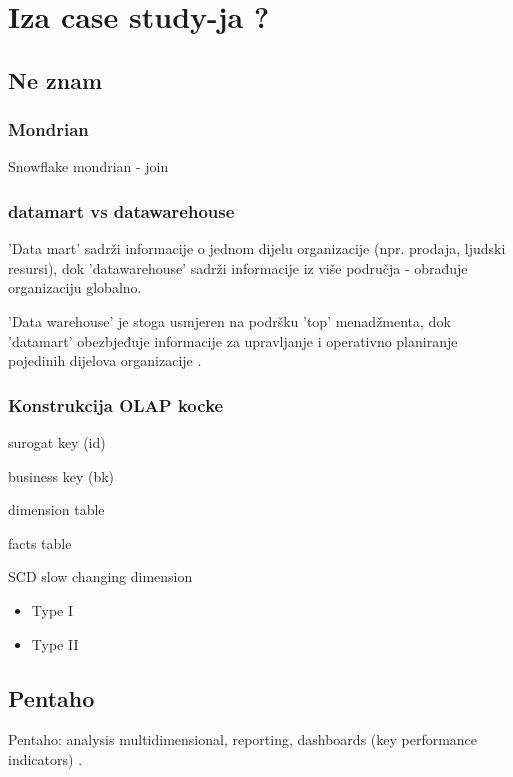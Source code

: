\documentclass[times, utf8, seminar]{fit}
\begin{document}
\chapter{Iza case study-ja ?}

\section{Ne znam}

\subsection{Mondrian}

Snowflake mondrian - join

\cite{web:pentaho:mondrian_schema}

\subsection{datamart vs datawarehouse}

'Data mart' sadrži informacije o jednom dijelu organizacije (npr. prodaja, ljudski resursi), dok 'datawarehouse' sadrži informacije iz više područja -  obrađuje organizaciju globalno. 

'Data warehouse' je stoga usmjeren na podršku 'top' menadžmenta, dok 'datamart' obezbjeđuje informacije za upravljanje i operativno planiranje pojedinih dijelova organizacije  \cite[str.~391]{pentaho32}.

\subsection{Konstrukcija OLAP kocke}

surogat key (id)

business key (bk)

dimension table

facts table

SCD slow changing dimension
\begin{itemize}
  \item Type I
  \item Type II
\end{itemize}



\section{Pentaho}

Pentaho: analysis multidimensional, reporting, dashboards (key performance indicators) \cite[str.~7]{pentaho32}.
\end{document}
